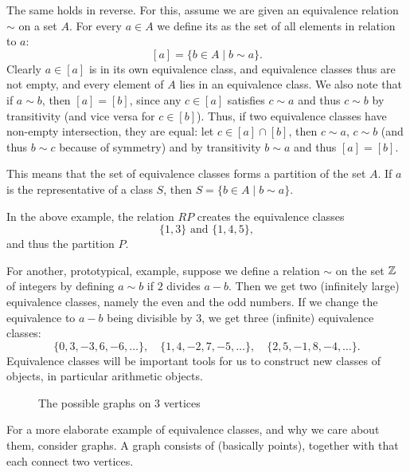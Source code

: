 The same holds in reverse. For this, assume we are given an equivalence
relation $\sim$ on a set $A$. For every $a\in A$ we
define its  as the set of all elements in relation
to $a$:
\[
[a]=\{b\in A\mid b\sim a\}.
\]
Clearly $a\in[a]$ is in its own equivalence class, and equivalence classes
thus are not empty, and every element of $A$ lies in an equivalence class.
We also note that if $a\sim b$, then $[a]=[b]$, since any $c\in[a]$
satisfies $c\sim a$ and thus $c\sim b$ by transitivity (and vice versa for
$c\in[b]$). Thus, if two equivalence classes have non-empty intersection,
they are equal: let $c\in [a]\cap [b]$, then $c\sim a$, $c\sim b$ (and
thus $b\sim c$
because of symmetry) and by transitivity $b\sim a$ and thus $[a]=[b]$.

This means that the set of equivalence classes forms a partition of the set
$A$. If $a$ is the representative of a class $S$, then $S=\{b\in A\mid b\sim a\}$.

In the above example, the relation  $RP$
creates the equivalence classes
\[
\{1,3\}\mbox{\ and\ }\{1,4,5\},
\] and thus the partition $P$.

For another, prototypical, example, suppose we define a relation $\sim$ on the set ${\mathbb Z}$ of
integers by defining $a\sim b$ if $2$ divides $a-b$. Then we get two
(infinitely large)
equivalence classes, namely the even and the odd numbers. If we change the
equivalence to $a-b$ being divisible by $3$, we get three
(infinite) equivalence classes:
\[
\{0,3,-3,6,-6,\ldots\},\quad
\{1,4,-2,7,-5,\ldots\},\quad
\{2,5,-1,8,-4,\ldots\}.
\]
Equivalence classes will be important tools for us to construct new classes
of objects, in particular arithmetic objects.
\medskip

\begin{figure}[t]
\begin{center}
\end{center}
\caption{The possible graphs on 3 vertices}
\label{3vertexgraphs}
\end{figure}

For a more elaborate example of equivalence classes, and why we care about
them, consider graphs. A graph consists of  (basically
points), together with  that each connect two vertices.

